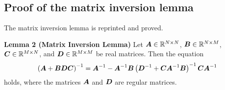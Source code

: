 \documentclass[twocolumn,a4paper,10pt]{article}
\begin{document}
\subsection{Proof of the matrix inversion lemma}

The matrix inversion lemma is reprinted and proved.

\vspace*{6pt}
\begin{thmbox}[M]{\bfseries{Lemma 2 (Matrix Inversion Lemma)}}
    Let
    $\boldsymbol{A} \in \mathbb{R}^{N \times N}$,
    $\boldsymbol{B} \in \mathbb{R}^{N \times M}$,
    $\boldsymbol{C} \in \mathbb{R}^{M \times N}$,
    and
    $\boldsymbol{D} \in \mathbb{R}^{M \times M}$
    be real matrices. Then the equation
    \begin{equation}
        \left( \boldsymbol{A} + \boldsymbol{BDC} \right)^{-1} = \boldsymbol{A}^{-1} - \boldsymbol{A}^{-1} \boldsymbol{B}
        \left( \boldsymbol{D}^{-1} + \boldsymbol{CA}^{-1} \boldsymbol{B} \right)^{-1} \boldsymbol{CA}^{-1}
    \end{equation}
    holds, where the matrices $\boldsymbol{A}$ and $\boldsymbol{D}$ are regular matrices.
\end{thmbox}
\vspace*{4pt}
\end{document}
